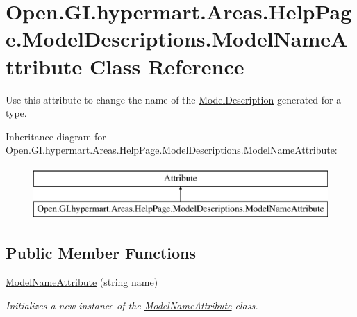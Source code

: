 \hypertarget{class_open_1_1_g_i_1_1hypermart_1_1_areas_1_1_help_page_1_1_model_descriptions_1_1_model_name_attribute}{}\section{Open.\+G\+I.\+hypermart.\+Areas.\+Help\+Page.\+Model\+Descriptions.\+Model\+Name\+Attribute Class Reference}
\label{class_open_1_1_g_i_1_1hypermart_1_1_areas_1_1_help_page_1_1_model_descriptions_1_1_model_name_attribute}


Use this attribute to change the name of the \hyperlink{class_open_1_1_g_i_1_1hypermart_1_1_areas_1_1_help_page_1_1_model_descriptions_1_1_model_description}{Model\+Description} generated for a type.  


Inheritance diagram for Open.\+G\+I.\+hypermart.\+Areas.\+Help\+Page.\+Model\+Descriptions.\+Model\+Name\+Attribute\+:\begin{figure}[H]
\begin{center}
\leavevmode
\includegraphics[height=2.000000cm]{class_open_1_1_g_i_1_1hypermart_1_1_areas_1_1_help_page_1_1_model_descriptions_1_1_model_name_attribute}
\end{center}
\end{figure}
\subsection*{Public Member Functions}
\begin{DoxyCompactItemize}
\item 
\hyperlink{class_open_1_1_g_i_1_1hypermart_1_1_areas_1_1_help_page_1_1_model_descriptions_1_1_model_name_attribute_a993a54c4cc771558eef5ea586b70d6d7}{Model\+Name\+Attribute} (string name)
\begin{DoxyCompactList}\small\item\em Initializes a new instance of the \hyperlink{class_open_1_1_g_i_1_1hypermart_1_1_areas_1_1_help_page_1_1_model_descriptions_1_1_model_name_attribute}{Model\+Name\+Attribute} class. \end{DoxyCompactList}\end{DoxyCompactItemize}
